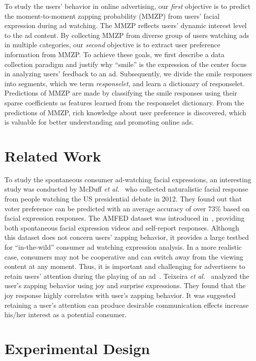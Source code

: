 \documentclass[10pt,journal,cspaper,compsoc]{IEEEtran}
\begin{document}
To study the users' behavior in online advertising, our \textit{first} objective is to predict the moment-to-moment zapping probability (MMZP) from users' facial expression during ad watching. The MMZP reflects users' dynamic interest level to the ad content. By collecting MMZP from diverse group of users watching ads in multiple categories, our \textit{second} objective is to extract user preference information from MMZP. To achieve these goals, we first describe a data collection paradigm and justify why ``smile'' is the expression of the center focus in analyzing users' feedback to an ad. Subsequently, we divide the smile responses into segments, which we term \textit{responselet}, and learn a dictionary of responselet. Predictions of MMZP are made by classifying the smile responses using their sparse coefficients as features learned from the responselet dictionary. From the predictions of MMZP, rich knowledge about user preference is discovered, which is valuable for better understanding and promoting online ads. 


\section{Related Work}

To study the spontaneous consumer ad-watching facial expressions, an interesting study was conducted by McDuff \textit{et al.}~\cite{McDuff13} who collected naturalistic facial response from people watching the US presidential debate in 2012. They found out that voter preference can be predicted with an average accuracy of over 73\% based on facial expression responses. The AMFED dataset was introduced in~\cite{amfed}, providing both spontaneous facial expression videos and self-report responses. Although this dataset does not concern users' zapping behavior, it provides a large testbed for ``in-the-wild'' consumer ad watching expression analysis. In a more realistic case, consumers may not be cooperative and can switch away from the viewing content at any moment. Thus, it is important and challenging for advertisers to retain users' attention during the playing of an ad~\cite{Elpers03}. Teixeira \textit{et al.}~\cite{Teixeira12} analyzed the user's zapping behavior using joy and surprise expressions. They found that the joy response highly correlates with user's zapping behavior. It was suggested retaining a user's attention can produce desirable communication effects increase his/her interest as a potential consumer. 


\section{Experimental Design}
\end{document}
